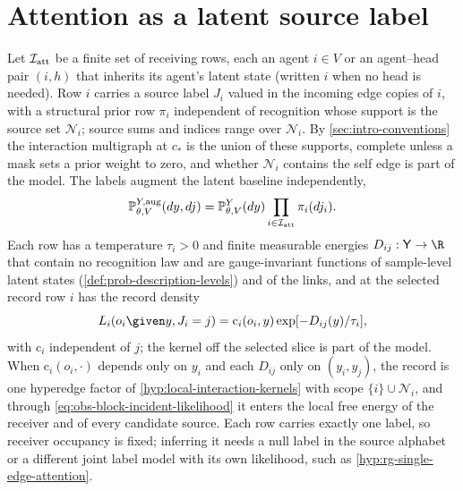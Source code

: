 \section{Attention as a latent source label}
\label{sec:local-attention-elbo}

Let \(\mathcal I_{\rm att}\) be a finite set of receiving rows, each an agent
\(i\in V\) or an agent--head pair \((i,h)\) that inherits its agent's latent
state (written \(i\) when no head is needed). Row \(i\) carries a source label
\(J_i\) valued in the incoming edge copies of \(i\), with a structural prior
row \(\pi_i\) independent of recognition whose support is the source set
\(\mathcal N_i\); source sums and indices range over \(\mathcal N_i\). By
\cref{sec:intro-conventions} the interaction multigraph at \(c_*\) is the union
of these supports, complete unless a mask sets a prior weight to zero, and
whether \(\mathcal N_i\) contains the self edge is part of the model. The
labels augment the latent baseline independently,
\begin{equation}
\mathbb P_{\theta,V}^{Y,\mathrm{aug}}(dy,dj)
=\mathbb P_{\theta,V}^{Y}(dy)
\prod_{i\in\mathcal I_{\rm att}}\pi_i(dj_i).
\label{eq:obs-attention-augmented-baseline}
\end{equation}
Each row has a temperature \(\tau_i>0\) and finite measurable energies
\(D_{ij}:\mathsf Y\to\R\) that contain no recognition law and are
gauge-invariant functions of sample-level latent states
(\cref{def:prob-description-levels}) and of the links, and at the selected
record row \(i\) has the record density
\begin{equation}
L_i(o_i\given y,J_i=j)
=\mathrm c_i(o_i,y)\exp[-D_{ij}(y)/\tau_i],
\label{eq:obs-attention-likelihood}
\end{equation}
with \(\mathrm c_i\) independent of \(j\); the kernel off the selected slice is
part of the model. When \(\mathrm c_i(o_i,\cdot)\) depends only on \(y_i\) and
each \(D_{ij}\) only on \((y_i,y_j)\), the record is one hyperedge factor of
\cref{hyp:local-interaction-kernels} with scope \(\{i\}\cup\mathcal N_i\), and
through \eqref{eq:obs-block-incident-likelihood} it enters the local free
energy of the receiver and of every candidate source. Each row carries exactly
one label, so receiver occupancy is fixed; inferring it needs a null label in
the source alphabet or a different joint label model with its own likelihood,
such as \cref{hyp:rg-single-edge-attention}.

